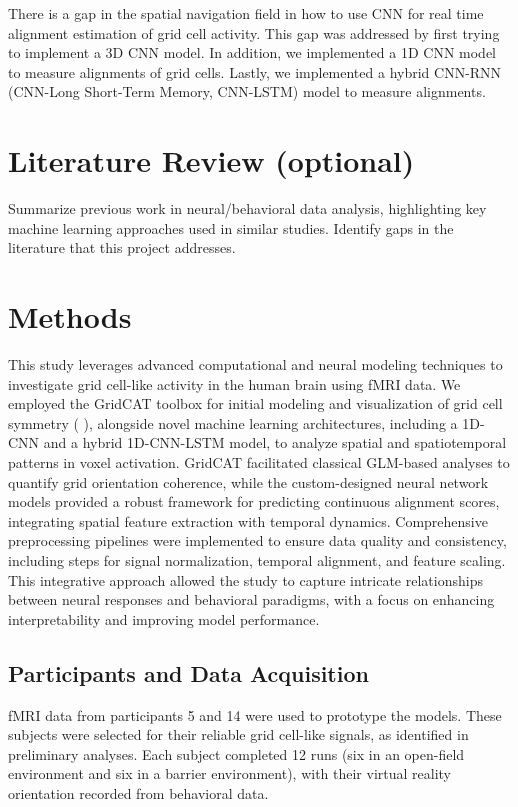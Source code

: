 \documentclass[a4paper]{article}
\begin{document}
 \noindent There is a gap in the spatial navigation field in how to use CNN for real time alignment estimation of grid cell activity. This gap was addressed by first trying to implement a 3D CNN model. In addition, we implemented a 1D CNN model to measure alignments of grid cells. Lastly, we implemented a hybrid CNN-RNN (CNN-Long Short-Term Memory, CNN-LSTM) model to measure alignments.  

\section{Literature Review (optional)}
\label{sec:literature_review}
    Summarize previous work in neural/behavioral data analysis, highlighting key machine learning approaches used in similar studies. Identify gaps in the literature that this project addresses.

\newpage
\section{Methods}
\label{sec:methods}

\noindent This study leverages advanced computational and neural modeling techniques to investigate grid cell-like activity in the human brain using fMRI data. We employed the GridCAT toolbox for initial modeling and visualization of grid cell symmetry (\cite{stangl_gridcat_2017-1} ), alongside novel machine learning architectures, including a 1D-CNN and a hybrid 1D-CNN-LSTM model, to analyze spatial and spatiotemporal patterns in voxel activation. GridCAT facilitated classical GLM-based analyses to quantify grid orientation coherence, while the custom-designed neural network models provided a robust framework for predicting continuous alignment scores, integrating spatial feature extraction with temporal dynamics. Comprehensive preprocessing pipelines were implemented to ensure data quality and consistency, including steps for signal normalization, temporal alignment, and feature scaling. This integrative approach allowed the study to capture intricate relationships between neural responses and behavioral paradigms, with a focus on enhancing interpretability and improving model performance. 


\subsection{Participants and Data Acquisition}
fMRI data from participants 5 and 14 were used to prototype the models. These subjects were selected for their reliable grid cell-like signals, as identified in preliminary analyses. Each subject completed 12 runs (six in an open-field environment and six in a barrier environment), with their virtual reality orientation recorded from behavioral data.
\end{document}

